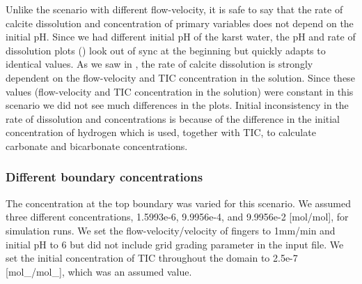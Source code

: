 Unlike the scenario with different flow-velocity, it is safe to say that the rate of calcite dissolution and concentration of primary variables 
does not depend on the initial pH. 
Since we had different initial pH of the karst water, the pH and rate of dissolution plots () look out of sync at the beginning but quickly adapts to identical values. 
As we saw in , the rate of calcite dissolution is strongly dependent on the flow-velocity and TIC concentration in the solution. 
Since these values (flow-velocity and TIC concentration in the solution) were constant in this scenario we did not see much differences in the plots. Initial 
inconsistency in the rate of dissolution and concentrations is because of the difference in the initial concentration of hydrogen which is used, together with TIC, 
to calculate carbonate and bicarbonate concentrations. 


\subsubsection*{Different boundary  concentrations} \label{ssec:diffInitialBC}
The  concentration at the top boundary was varied for this scenario. We assumed three different  concentrations, 
1.5993e-6, 9.9956e-4, and 9.9956e-2 [mol/mol], for simulation runs. We set the flow-velocity/velocity of  fingers to 1mm/min 
and initial pH to 6 but did not include grid grading parameter in the input file. We set the initial concentration of 
TIC throughout the domain to 2.5e-7 [mol\_/mol\_], which was an assumed value. \\

